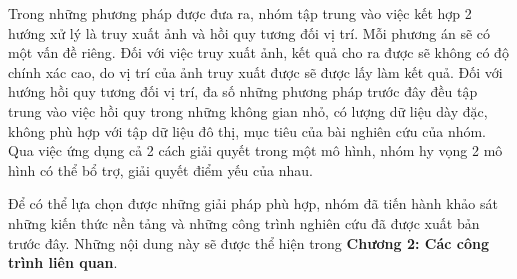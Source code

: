 Trong những phương pháp được đưa ra, nhóm tập trung vào việc kết hợp 2 hướng xử lý là truy xuất ảnh và hồi quy tương đối vị trí. Mỗi phương án sẽ có một vấn đề riêng. Đối với việc truy xuất ảnh, kết quả cho ra được sẽ không có độ chính xác cao, do vị trí của ảnh truy xuất được sẽ được lấy làm kết quả. Đối với hướng hồi quy tương đối vị trí, đa số những phương pháp trước đây đều tập trung vào việc hồi quy trong những không gian nhỏ, có lượng dữ liệu dày đặc, không phù hợp với tập dữ liệu đô thị, mục tiêu của bài nghiên cứu của nhóm. Qua việc ứng dụng cả 2 cách giải quyết trong một mô hình, nhóm hy vọng 2 mô hình có thể bổ trợ, giải quyết điểm yếu của nhau.

Để có thể lựa chọn được những giải pháp phù hợp, nhóm đã tiến hành khảo sát những kiến thức nền tảng và những công trình nghiên cứu đã được xuất bản trước đây. Những nội dung này sẽ được thể hiện trong \textbf{Chương 2: Các công trình liên quan}.